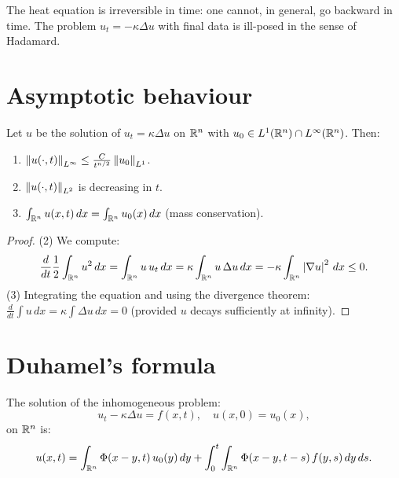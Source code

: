 \begin{warning}[title=\textbf{Irreversibility}]
The heat equation is irreversible in time: one cannot, in general, go
backward in time. The problem $u_t = -\kappa\Delta u$ with final data is
ill-posed in the sense of Hadamard.
\end{warning}

\section{Asymptotic behaviour}

\begin{theorem}
Let $u$ be the solution of $u_t = \kappa\Delta u$ on $\mathbb{R}^n$ with
$u_0 \in L^1(\mathbb{R}^n) \cap L^\infty(\mathbb{R}^n)$. Then:
\begin{enumerate}
    \item $\left\| u(\cdot,t) \right\|_{L^\infty} \leq \frac{C}{t^{n/2}}\left\| u_0 \right\|_{L^1}$.
    \item $\left\| u(\cdot,t) \right\|_{L^2}$ is decreasing in $t$.
    \item $\int_{\mathbb{R}^n} u(x,t)\, dx = \int_{\mathbb{R}^n} u_0(x)\, dx$ (mass conservation).
\end{enumerate}
\end{theorem}

\begin{proof}
(2) We compute:
\[
    \frac{d}{dt}\frac{1}{2}\int_{\mathbb{R}^n} u^2\, dx
    = \int_{\mathbb{R}^n} u\, u_t\, dx
    = \kappa\int_{\mathbb{R}^n} u\, \Delta u\, dx
    = -\kappa\int_{\mathbb{R}^n} \left| \nabla u \right|^2\, dx \leq 0.
\]
(3) Integrating the equation and using the divergence theorem:
$\frac{d}{dt}\int u\, dx = \kappa\int \Delta u\, dx = 0$ (provided $u$
decays sufficiently at infinity).
\end{proof}

\section{Duhamel's formula}

\begin{theorem}
The solution of the inhomogeneous problem:
\[
    u_t - \kappa\Delta u = f(x,t), \quad u(x,0) = u_0(x),
\]
on $\mathbb{R}^n$ is:
\begin{equation}\label{eq:duhamel}
    u(x,t) = \int_{\mathbb{R}^n} \Phi(x-y,t)\, u_0(y)\, dy
    + \int_0^t \int_{\mathbb{R}^n} \Phi(x-y, t-s)\, f(y,s)\, dy\, ds.
\end{equation}
\end{theorem}

